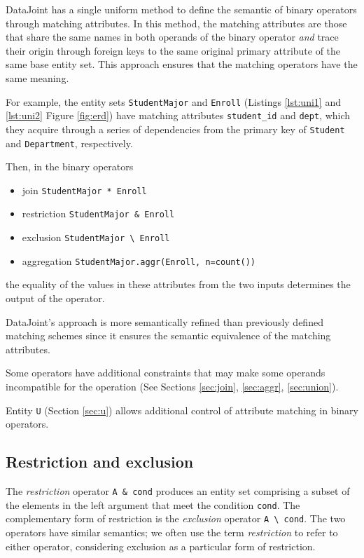 \documentclass[letter,10pt]{article}
\newcommand{\datajoint}{DataJoint\xspace}
\begin{document}
\datajoint has a single uniform method to define the semantic of binary operators through matching attributes.  
In this method, the matching attributes are those that share the same names in both operands of the binary operator \emph{and} trace their origin through foreign keys to the same original primary attribute of the same base entity set.
This approach ensures that the matching operators have the same meaning. 

For example, the entity sets \lstinline$StudentMajor$ and \lstinline$Enroll$ (Listings \ref{lst:uni1} and \ref{lst:uni2} Figure \ref{fig:erd}) have matching attributes \lstinline$student_id$ and \lstinline$dept$, which they acquire through a series of dependencies from the primary key of \lstinline$Student$ and \lstinline$Department$, respectively.  

Then, in the binary operators 
\begin{itemize}
\item join \lstinline$StudentMajor * Enroll$ 
\item restriction \lstinline$StudentMajor & Enroll$ 
\item exclusion \lstinline$StudentMajor \ Enroll$ 
\item aggregation \lstinline$StudentMajor.aggr(Enroll, n=count())$ 
\end{itemize}
 the equality of the values in these attributes from the two inputs determines the output of the operator.

\datajoint's approach is more semantically refined than previously defined matching schemes since it ensures the semantic equivalence of the matching attributes.

Some operators have additional constraints that may make some operands incompatible for the operation (See Sections \ref{sec:join}, \ref{sec:aggr}, \ref{sec:union}).

Entity \lstinline$U$ (Section \ref{sec:u}) allows additional control of attribute matching in binary operators.

\subsection{Restriction and exclusion}\label{sec:restrict}
The \emph{restriction} operator \lstinline$A & cond$ produces an entity set comprising a subset of the elements in the left argument that meet the condition \lstinline$cond$. 
The complementary form of restriction is the \emph{exclusion} operator \lstinline$A \ cond$.
The two operators have similar semantics; we often use the term \emph{restriction} to refer to either  operator, considering exclusion as a particular form of restriction.
\end{document}
